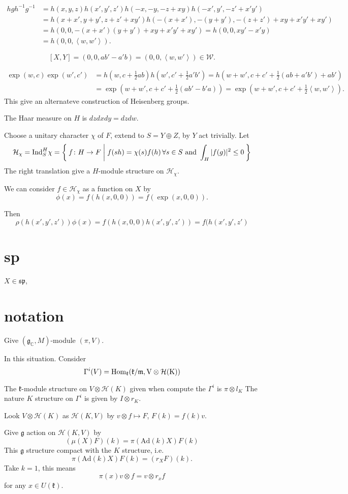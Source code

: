 \documentclass[12pt]{amsart}
\def\Hom{\rm{Hom}}
\def\Ind{{\rm Ind}}
\def\bC{{\mathbb{C}}}
\def\sp{{\mathfrak{sp}}}
\def\Ad{{\rm Ad}}
\def\inn#1#2{\left\langle{#1},{#2}\right\rangle}
\def\Ad{\mathrm{Ad}}
\def\lww{\mathcal{W}}
\def\fgg{\mathfrak{g}}
\def\fkk{\mathfrak{k}}
\def\chh{\mathcal{H}}
\def\fmm{\mathfrak{m}}
\begin{document}
\[
\begin{split}
hgh^{-1}g^{-1} &= h(x,y,z)h(x',y',z') h(-x,-y,-z+xy) h(-x',y',-z'+x'y')\\
&= h(x+x',y+y', z+z'+xy')h(-(x+x'),-(y+y'), -(z+z')+xy+x'y'+xy')\\
&= h(0,0,-(x+x')(y+y')+xy + x'y' +xy')
= h(0,0,xy'-x'y)\\ 
&= h(0,0,\inn{w}{w'}).
\end{split}
\]

\[
[X,Y] = (0,0,ab'-a'b) = (0,0,\inn{w}{w'}) \in \lww.
\]

\[
\begin{split}
\exp(w,c)\exp(w',c') &= h(w,c+\frac{1}{2}ab)h(w',c'+\frac{1}{2}a'b')
= h(w+w',c+c'+\frac{1}{2}(ab+a'b')+ab')\\
&= \exp(w+w', c+c'+\frac{1}{2}(ab'-b'a)) = 
\exp(w+w',c+c'+\frac{1}{2}\inn{w}{w'}).
\end{split}
\]
This give an alternateve construction of Heisenberg groups. 

The Haar measure on $H$ is $dzdxdy = dzdw$.


Choose a unitary character $\chi$ of $F$, extend to $S = Y\oplus Z$, by 
$Y$ act trivially.
Let 
\[
\chh_\chi = \Ind_S^H \chi 
=  \Set{f\colon H\to F|f(sh) = \chi(s)f(h)\, \forall s\in S\text{ and }
   \int_{H} |f(g)|^2 \leq 0}
\]
The right translation give a $H$-module structure on $\chh_\chi$.  

We can consider $f\in \chh_\chi$ as a function on $X$ by 
\[
\phi(x) =f(h(x,0,0)) = f(\exp(x,0,0)).
\]

Then 
\[
\rho(h(x',y',z'))\phi(x) = f(h(x,0,0)h(x',y',z')) =
f(h(x',y',z')
\]

\section{sp}

$X\in \sp$, 
\section{notation}



Give $(\fgg_\bC, M)$-module $(\pi, V)$.

In this situation. 
Consider 
\[
\Gamma^i (V) = \Hom_{\fkk}(\fkk/\fmm, V\otimes \chh(K))
\]


The $\fkk$-module structure on $V\otimes \chh(K)$ given when compute the
$\Gamma^i$ is $\pi\otimes l_K$
The nature $K$ structure on $\Gamma^i$ is given by $I\otimes r_K$.

Look $V\otimes \chh(K)$ as $\chh(K, V)$ by $v\otimes f \mapsto F$, 
$F(k) = f(k)v$. 
 
Give $\fgg$ action on $\chh(K,V)$ by 
\[
(\mu(X)F)(k) = \pi(\Ad(k) X) F(k)
\]
This $\fgg$ structure compact with the $K$ structure, i.e. 
\[
\pi(\Ad(k) X) F(k) = (r_X F)(k).
\]
Take $k=1$, 
this means 
\[
\pi(x)v \otimes f = v \otimes r_x f
\]
for any $x\in U(\fkk)$.
\end{document}
